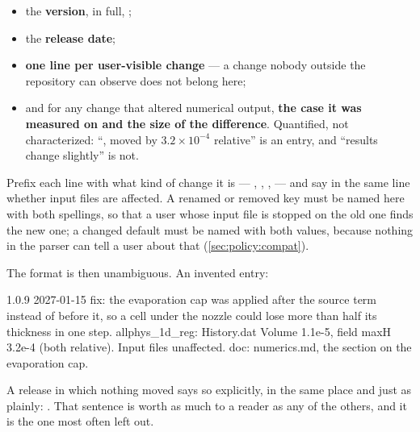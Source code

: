 \begin{itemize}
  \item the \textbf{version}, in full, ;
  \item the \textbf{release date};
  \item \textbf{one line per user-visible change} --- a change nobody outside
    the repository can observe does not belong here;
  \item and for any change that altered numerical output, \textbf{the case it
    was measured on and the size of the difference}. Quantified, not
    characterized: ``,  moved by
    $3.2\times10^{-4}$ relative'' is an entry, and ``results change slightly'' is
    not.
\end{itemize}

Prefix each line with what kind of change it is --- , ,
,  --- and say in the same line whether input files are
affected. A renamed or removed key must be named here with both spellings, so
that a user whose input file is stopped on the old one finds the new one; a
changed default must be named with both values, because nothing in the parser
can tell a user about that (\cref{sec:policy:compat}).

The format is then unambiguous. An invented entry:

\begin{plain}
1.0.9  2027-01-15
  fix: the evaporation cap was applied after the source term instead of before
       it, so a cell under the nozzle could lose more than half its thickness
       in one step.  allphys_1d_reg: History.dat Volume 1.1e-5, field maxH
       3.2e-4 (both relative).  Input files unaffected.
  doc: numerics.md, the section on the evaporation cap.
\end{plain}

A release in which nothing moved says so explicitly, in the same place and just
as plainly: .
That sentence is worth as much to a reader as any of the others, and it is the
one most often left out.
